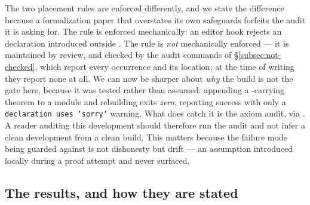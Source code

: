 The two placement rules are enforced differently, and we state the difference
because a formalization paper that overstates its own safeguards forfeits the
audit it is asking for. The  rule is enforced mechanically: an
editor hook rejects an  declaration introduced outside
. The  rule is \emph{not} mechanically
enforced --- it is maintained by review, and checked by the audit commands of
\S\ref{subsec:not-checked}, which report every occurrence and its location; at
the time of writing they report none at all. We can now be sharper about
\emph{why} the build is not the gate here, because it was tested rather than
assumed: appending a -carrying theorem to a module and
rebuilding exits \emph{zero}, reporting success with only a
\texttt{declaration uses `sorry`} warning. What does catch it is the axiom
audit, via . A reader auditing this development should
therefore run the audit and not infer a clean development from a clean build. This matters because the failure mode
being guarded against is not dishonesty but drift --- an assumption introduced
locally during a proof attempt and never surfaced.

\subsection{The results, and how they are stated}

